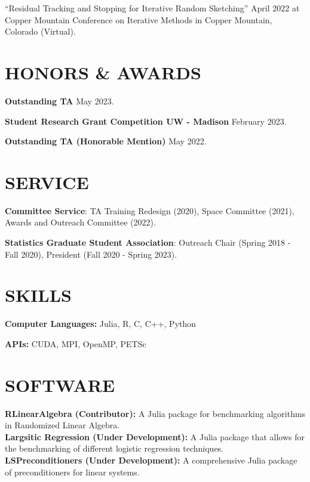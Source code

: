\documentclass[margin,11pt]{res}
\begin{document}
\begin{resume}
``Residual Tracking and Stopping for Iterative Random Sketching'' April 2022 at Copper Mountain Conference on Iterative Methods in Copper Mountain, Colorado (Virtual).




\section{HONORS \& AWARDS} 
{\bf Outstanding TA} \hfill May 2023.

{\bf Student Research Grant Competition UW - Madison} \hfill February 2023.

{\bf Outstanding TA (Honorable Mention)} \hfill May 2022.

\section{SERVICE}

\textbf{Committee Service}: TA Training Redesign (2020), Space Committee (2021), Awards and Outreach Committee (2022).

\textbf{Statistics Graduate Student Association}: Outreach Chair (Spring 2018 - Fall 2020), President (Fall 2020 - Spring 2023). 

\section{SKILLS}
\textbf{Computer Languages:} Julia, R, C, C++, Python

\textbf{APIs:} CUDA, MPI, OpenMP, PETSc
\section{SOFTWARE}
\textbf{RLinearAlgebra (Contributor):} A Julia package for benchmarking algorithms in Randomized Linear Algebra.\\
\textbf{Largsitic Regression (Under Development):} A Julia package that allows for the benchmarking of different logistic regression techniques.\\
\textbf{LSPreconditioners (Under Development):} A comprehensive Julia package of preconditioners for linear systems.

\end{resume} 
\end{document}
